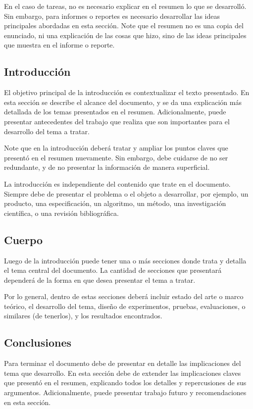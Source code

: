 \documentclass[twocolumn,11pts]{IEEEtran}
\begin{document}
En el caso de tareas, no es necesario explicar en el resumen lo que se desarrolló. Sin embargo, para informes o reportes es necesario desarrollar las ideas principales abordadas en esta sección. Note que el resumen no es una copia del enunciado, ni una explicación de las cosas que hizo, sino de las ideas principales que muestra en el informe o reporte.

\subsection{Introducción}
El objetivo principal de la introducción es contextualizar el texto presentado. En esta sección se describe el alcance del documento, y se da una explicación más detallada de los temas presentados en el resumen. Adicionalmente, puede presentar antecedentes del trabajo que realiza que son importantes para el desarrollo del tema a tratar.

Note que en la introducción deberá tratar y ampliar los puntos claves que presentó en el resumen nuevamente. Sin embargo, debe cuidarse de no ser redundante, y de no presentar la información de manera superficial.

La introducción es independiente del contenido que trate en el documento. Siempre debe de presentar el problema o el objeto a desarrollar, por ejemplo, un producto, una especificación, un algoritmo, un método, una investigación científica, o una revisión bibliográfica.

\subsection{Cuerpo}
Luego de la introducción puede tener una o más secciones donde trata y detalla el tema central del documento. La cantidad de secciones que presentará dependerá de la forma en que desea presentar el tema a tratar.

Por lo general, dentro de estas secciones deberá incluir estado del arte o marco teórico, el desarrollo del tema, diseño de experimentos, pruebas, evaluaciones, o similares (de tenerlos), y los resultados encontrados.

\subsection{Conclusiones}
Para terminar el documento debe de presentar en detalle las implicaciones del tema que desarrollo. En esta sección debe de extender las implicaciones claves que presentó en el resumen, explicando todos los detalles y repercusiones de sus argumentos. Adicionalmente, puede presentar trabajo futuro y recomendaciones en esta sección.
\end{document}
